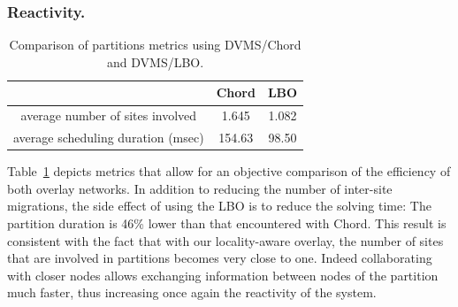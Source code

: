 


\subsubsection{Reactivity.}
\begin{table}[t!]

  \begin{center}
    \begin{tabular}{|c|c|c|}   

      \hline \multicolumn{1}{|p{3cm}|}{ }
       & \multicolumn{1}{|p{3cm}|}{\centering Chord }  & \multicolumn{1}{|p{3cm}|}{ \centering LBO}  \\

      \hline
      average number of sites involved & 1.645 & 1.082 \\

      \hline
      average scheduling duration (msec) & 154.63 & 98.50 \\

      \hline
    \end{tabular}
  \end{center}
  \caption{\label{partitions_table} Comparison of partitions metrics
    using DVMS/Chord and DVMS/LBO.}
  \vspace{-0.3cm}
\end{table}


Table~\ref{partitions_table} depicts metrics that allow for an objective 
comparison of the efficiency of both overlay networks. In addition to reducing 
the number of inter-site migrations, the side effect of using the LBO is to 
reduce the solving time: The partition duration is 46\% lower than that encountered 
with Chord. This result is consistent with the fact that with our locality-aware
overlay, the number of sites that are involved in partitions becomes very close 
to one. Indeed collaborating with closer nodes allows exchanging information between
nodes of the partition much faster, thus increasing once again the reactivity
of the system.

% 
